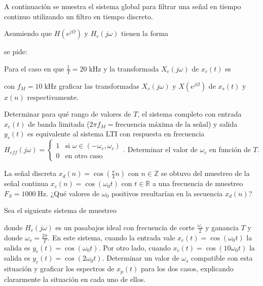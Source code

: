 

\begin{ejercicio}
    A continuación se muestra el sistema global para filtrar una señal en tiempo continuo utilizando un filtro en tiempo discreto.
    \begin{center}
        
    \end{center}
    Asumiendo que $H(e^{j\Omega})$ y $H_r(j\omega)$ tienen la forma
    \begin{center}
        
    \end{center}
    se pide:
    
    \inciso Para el caso en que $\frac{1}{T}=20\;\mathrm{kHz}$ y la transformada $X_c(j\omega)$ de $x_c(t)$ es
    \begin{center}
        
    \end{center}
    con $f_M=10\;\mathrm{kHz}$ graficar las transformadas $X_s(j\omega)$ y $X(e^{j\Omega})$ de $x_s(t)$ y $x(n)$ respectivamente.
    
    \inciso Determinar para qué rango de valores de $T$, el sistema completo con entrada $x_c(t)$ de banda limitada ($2\pi f_M=\mbox{frecuencia máxima de la señal}$) y salida $y_r(t)$ es equivalente al sistema LTI con respuesta en frecuencia $H_{eff}(j\omega)=\begin{cases}1 & \mbox{si $\omega \in (-\omega_c,\omega_c)$}\\ 0 & \mbox{en otro caso}\end{cases}$. Determinar el valor de $\omega_c$ en función de $T$.
    
\end{ejercicio}
    
    
\begin{ejercicio}
    La señal discreta $x_d(n)=\cos\left(\frac{\pi}{4}n\right)$ con $n\in\mathbb{Z}$ se obtuvo del muestreo de la señal continua $x_c(n)=\cos\left(\omega_0 t\right)$ con $t\in\mathbb{R}$ a una frecuencia de muestreo $F_S = 1000\;\mathrm{Hz}$. ¿Qué valores de $\omega_0$ positivos resultarían en la secuencia $x_d(n)$?
\end{ejercicio}

\begin{ejercicio}
    Sea el siguiente sistema de muestreo
    \begin{center}
    
    \end{center}
    donde $H_c(j\omega)$ es un pasabajos ideal con frecuencia de corte $\frac{\omega_s}{2}$ y ganancia $T$ y donde $\omega_s = \frac{2\pi}{T}$. En este sistema, cuando la entrada vale $x_c(t) = \cos(\omega_0 t)$ la salida es $y_c(t) = \cos(\omega_0 t)$. Por otro lado, cuando $x_c(t) = \cos(10\omega_0 t)$ la salida es $y_c(t) = \cos(2\omega_0 t)$. Determinar un valor de $\omega_s$ compatible con esta situación y graficar los espectros de $x_p(t)$ para los dos casos, explicando clararmente la situación en cada uno de ellos.
\end{ejercicio}
    
